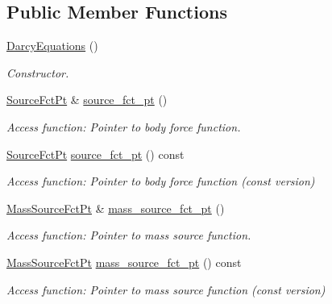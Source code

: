 \subsection*{Public Member Functions}
\begin{DoxyCompactItemize}
\item 
\hyperlink{classoomph_1_1DarcyEquations_a5b8e0269c593f216020e618b11bef912}{Darcy\+Equations} ()
\begin{DoxyCompactList}\small\item\em Constructor. \end{DoxyCompactList}\item 
\hyperlink{classoomph_1_1DarcyEquations_adcf88d9573b0f1c1988bdae6234eb7f8}{Source\+Fct\+Pt} \& \hyperlink{classoomph_1_1DarcyEquations_abe4a6fd3c37700bcf18a51a71e2d3c0d}{source\+\_\+fct\+\_\+pt} ()
\begin{DoxyCompactList}\small\item\em Access function\+: Pointer to body force function. \end{DoxyCompactList}\item 
\hyperlink{classoomph_1_1DarcyEquations_adcf88d9573b0f1c1988bdae6234eb7f8}{Source\+Fct\+Pt} \hyperlink{classoomph_1_1DarcyEquations_a670893e19f2ac6f7f02f0d5b03ca0b16}{source\+\_\+fct\+\_\+pt} () const
\begin{DoxyCompactList}\small\item\em Access function\+: Pointer to body force function (const version) \end{DoxyCompactList}\item 
\hyperlink{classoomph_1_1DarcyEquations_abb20685508a2704d195f3b8e124d20b4}{Mass\+Source\+Fct\+Pt} \& \hyperlink{classoomph_1_1DarcyEquations_ac037d03df5b7530cf9048160a6601fd6}{mass\+\_\+source\+\_\+fct\+\_\+pt} ()
\begin{DoxyCompactList}\small\item\em Access function\+: Pointer to mass source function. \end{DoxyCompactList}\item 
\hyperlink{classoomph_1_1DarcyEquations_abb20685508a2704d195f3b8e124d20b4}{Mass\+Source\+Fct\+Pt} \hyperlink{classoomph_1_1DarcyEquations_a076ef9f7b1292436e7fd522476c73fc5}{mass\+\_\+source\+\_\+fct\+\_\+pt} () const
\begin{DoxyCompactList}\small\item\em Access function\+: Pointer to mass source function (const version) \end{DoxyCompactList}\item 

\end{DoxyCompactItemize}
